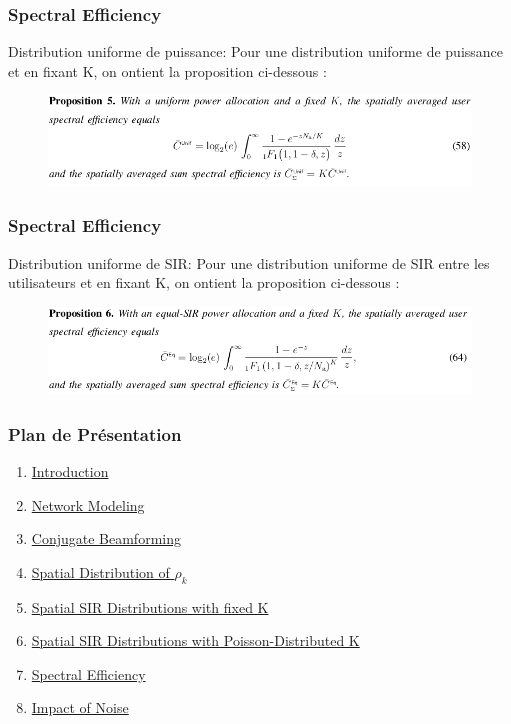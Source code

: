 \documentclass[pdf]{beamer}
\begin{document}
\begin{frame}[label=spectralEfficiency]
\frametitle{Spectral Efficiency}
\begin{exampleblock}{Distribution uniforme de puissance:}
Pour une distribution uniforme de puissance et en fixant K, on ontient la proposition ci-dessous : 
\begin{figure}
	\includegraphics[width=1\linewidth]{6}
\end{figure}
\end{exampleblock}
\end{frame}
\begin{frame}[label=spectralEfficiency]
\frametitle{Spectral Efficiency}
\begin{exampleblock}{Distribution uniforme de SIR:}
Pour une distribution uniforme de SIR entre les utilisateurs et en fixant K, on ontient la proposition ci-dessous : 
\begin{figure}
	\includegraphics[width=1\linewidth]{7}
\end{figure}
\end{exampleblock}
\end{frame}


\begin{frame}
\frametitle{Plan de Présentation }
\begin{enumerate}
	\item \hyperlink{Introduction}{Introduction}
	\item \hyperlink{networkModeling}{Network Modeling}
	\item \hyperlink{conjugateBeamforming}{Conjugate Beamforming}
	\item \hyperlink{spatialDistribution}{Spatial Distribution of $\rho_k$}
	\item \hyperlink{spatialsir}{Spatial SIR Distributions with fixed K}
	\item \hyperlink{spatialsirk}{Spatial SIR Distributions with Poisson-Distributed K}
	\item \hyperlink{spectralEfficiency}{Spectral Efficiency}
	\item \hyperlink{impactOfNoise}{Impact of Noise}
\end{enumerate}
\end{frame}
\end{document}
